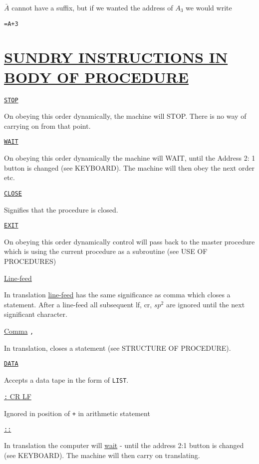 \documentclass[10pt, a4paper, oneside]{article}
\newcommand{\myuline}[1]{\uline{#1}}
\newcommand{\mytt}[1]{\texttt{\scriptsize #1}}
\newcommand{\mytt}[1]{\texttt{\small #1}}
\begin{document}
\begin{multicols}{2}
$\bar{A}$ cannot have a suffix, but if we wanted the
address of $A_{3}$ we would write

\begin{addmargin}[1cm]{1em}%
\begin{lstlisting}
=A+3
\end{lstlisting}
\end{addmargin}


\section{\myuline{SUNDRY INSTRUCTIONS IN BODY OF PROCEDURE}}

\hspace{\parindent}\myuline{\mytt{STOP}}

On obeying this order dynamically, the machine
will STOP.  There is no way of carrying on from that
point.

\myuline{\mytt{WAIT}}

On obeying this order dynamically the machine will
WAIT, until the Address 2: 1 button is changed (see
KEYBOARD).  The machine will then obey the next order
etc.

\myuline{\mytt{CLOSE}}

Signifies that the procedure is closed.

\myuline{\mytt{EXIT}}

On obeying this order dynamically control will
pass back to the master procedure which is using the
current procedure as a subroutine (see USE OF
PROCEDURES)

\myuline{Line-feed}

In translation \myuline{line-feed} has the same significance
as comma which closes a statement.  After a line-feed
all subsequent lf, cr, $sp^{2}$ are ignored until the next
significant character.

\myuline{Comma} \mytt{,}

In translation, closes a statement (see STRUCTURE
OF PROCEDURE).

\myuline{\mytt{DATA}}

Accepts a data tape in the form of \mytt{LIST}.

\myuline{\mytt{:} CR LF}

Ignored in position of \mytt{+} in arithmetic statement

\myuline{\mytt{::}}

In translation the computer will \myuline{wait} - until the
address 2:1 button is changed (see KEYBOARD).  The
machine will then carry on translating.



\end{multicols}
\end{document}
